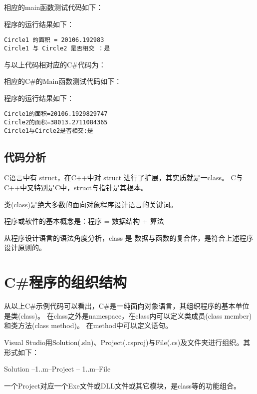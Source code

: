 相应的main函数测试代码如下：



程序的运行结果如下：
\begin{verbatim}
Circle1 的面积 = 20106.192983
Circle1 与 Circle2 是否相交 ：是
\end{verbatim}


与以上代码相对应的C\#代码为：




相应的C\#的Main函数测试代码如下：



程序的运行结果如下：
\begin{verbatim}
Circle1的面积=20106.1929829747
Circle2的面积=38013.2711084365
Circle1与Circle2是否相交:是
\end{verbatim}

\subsection{代码分析}
C语言中有 struct，在C++中对 struct 进行了扩展，其实质就是一class。
C与C++中又特别是C中，struct与指针是其根本。

类(class)是绝大多数的面向对象程序设计语言的关键词。

程序或软件的基本概念是：程序 = 数据结构 + 算法

从程序设计语言的语法角度分析，class 是 数据与函数的复合体，是符合上述程序设计原则的。

\section{ C\#程序的组织结构}

 从以上C\#示例代码可以看出，C\#是一纯面向对象语言，其组织程序的基本单位是类(class)。
 在class之外是namespace，在class内可以定义类成员(class member)和类方法(class method)。
 在method中可以定义语句。

 Visual Studio用Solution(.sln)、Project(.csproj)与File(.cs)及文件夹进行组织。其形式如下：

 Solution --1..m--Project -- 1..m--File

 一个Project对应一个Exe文件或DLL文件或其它模块，是class等的功能组合。